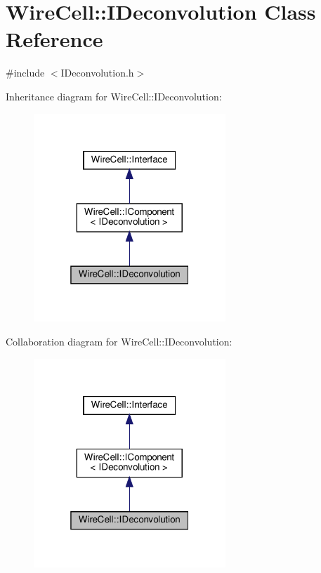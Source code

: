 \hypertarget{class_wire_cell_1_1_i_deconvolution}{}\section{Wire\+Cell\+:\+:I\+Deconvolution Class Reference}
\label{class_wire_cell_1_1_i_deconvolution}


{\ttfamily \#include $<$I\+Deconvolution.\+h$>$}



Inheritance diagram for Wire\+Cell\+:\+:I\+Deconvolution\+:
\nopagebreak
\begin{figure}[H]
\begin{center}
\leavevmode
\includegraphics[width=205pt]{class_wire_cell_1_1_i_deconvolution__inherit__graph}
\end{center}
\end{figure}


Collaboration diagram for Wire\+Cell\+:\+:I\+Deconvolution\+:
\nopagebreak
\begin{figure}[H]
\begin{center}
\leavevmode
\includegraphics[width=205pt]{class_wire_cell_1_1_i_deconvolution__coll__graph}
\end{center}
\end{figure}
